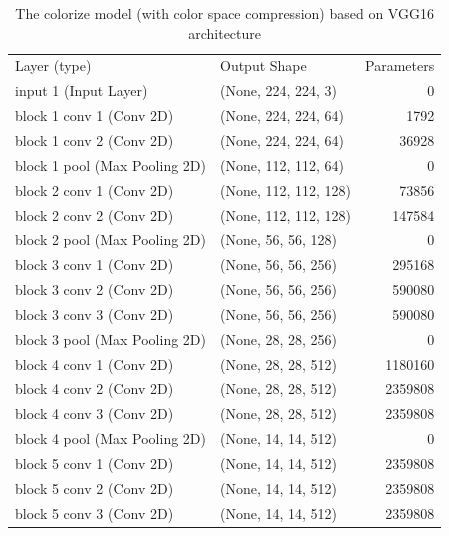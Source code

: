 \documentclass[12pt]{article}
\begin{document}
\begin{table}[H]
	\caption{The colorize model (with color space compression) based on VGG16 architecture}
  	\centering
	\begin{tabular}{|l|l|r|}
		\hline 
		Layer (type)                  &  Output Shape           &    Parameters  \\ \hhline{|=|=|=|}
		input 1 (Input Layer)         &  (None, 224, 224, 3)    &    0           \\ \hline
		block 1 conv 1 (Conv 2D)      &  (None, 224, 224, 64)   &    1792        \\ \hline 
		block 1 conv 2 (Conv 2D)      &  (None, 224, 224, 64)   &    36928       \\ \hline 
		block 1 pool (Max Pooling 2D) &  (None, 112, 112, 64)   &    0           \\ \hline 
		block 2 conv 1 (Conv 2D)      &  (None, 112, 112, 128)  &    73856       \\ \hline 
		block 2 conv 2 (Conv 2D)      &  (None, 112, 112, 128)  &    147584      \\ \hline 
		block 2 pool (Max Pooling 2D) &  (None, 56, 56, 128)    &    0           \\ \hline 
		block 3 conv 1 (Conv 2D)      &  (None, 56, 56, 256)    &    295168      \\ \hline 
		block 3 conv 2 (Conv 2D)      &  (None, 56, 56, 256)    &    590080      \\ \hline 
		block 3 conv 3 (Conv 2D)      &  (None, 56, 56, 256)    &    590080      \\ \hline 
		block 3 pool (Max Pooling 2D) &  (None, 28, 28, 256)    &    0           \\ \hline 
		block 4 conv 1 (Conv 2D)      &  (None, 28, 28, 512)    &    1180160     \\ \hline 
		block 4 conv 2 (Conv 2D)      &  (None, 28, 28, 512)    &    2359808     \\ \hline 
		block 4 conv 3 (Conv 2D)      &  (None, 28, 28, 512)    &    2359808     \\ \hline 
		block 4 pool (Max Pooling 2D) &  (None, 14, 14, 512)    &    0           \\ \hline 
		block 5 conv 1 (Conv 2D)      &  (None, 14, 14, 512)    &    2359808     \\ \hline 	
		block 5 conv 2 (Conv 2D)      &  (None, 14, 14, 512)    &    2359808     \\ \hline 
		block 5 conv 3 (Conv 2D)      &  (None, 14, 14, 512)    &    2359808     \\ \hline 

\end{tabular}
\end{table}
\end{document}
